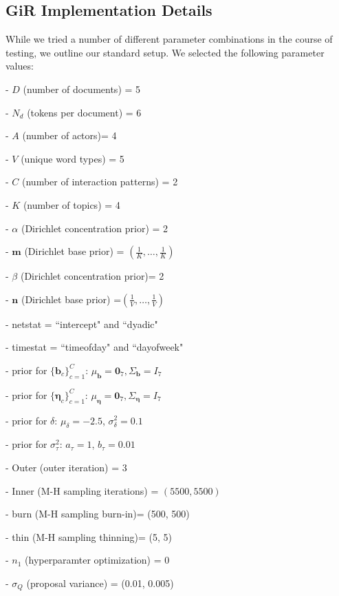 \documentclass[a4paper]{article}
\begin{document}
  \subsection{GiR Implementation Details} \label{subsec: GiR implementation}
  While we tried a number of different parameter combinations in the course of testing, we outline our standard setup. We selected the following parameter values:
  \begin{itemize}
  	\begin{minipage}{0.49\textwidth}
  		\item[-] $D$ (number of documents) = 5
  		\item[-] $N_d$ (tokens per document) = 6
  		\item[-] $A$ (number of actors)= 4
  		\item[-] $V$ (unique word types) = 5
  		\item[-] $C$ (number of interaction patterns) = 2
  		\item[-] $K$ (number of topics) = 4
  		\item[-] $\alpha$ (Dirichlet concentration prior) = 2
  		\item[-] $\boldsymbol{m}$ (Dirichlet base prior) = $(\frac{1}{K},\ldots, \frac{1}{K})$ 
  		\item[-] $\beta$ (Dirichlet concentration prior)= 2
  		\item[-] $\boldsymbol{n}$ (Dirichlet base prior) =$(\frac{1}{V},\ldots, \frac{1}{V})$ 
  		\item[-] netstat = ``intercept" and ``dyadic"
	   \item[-] timestat = ``timeofday" and ``dayofweek" 
  	\end{minipage}
  	\begin{minipage}{0.49\textwidth}
  		\item[-] prior for $\{\boldsymbol{b}_c\}_{c=1}^C$: $\mu_{\boldsymbol{b}} = \boldsymbol{0}_7, \Sigma_{\boldsymbol{b}} =  I_7$
  			\item[-] prior for $\{\boldsymbol{\eta}_c\}_{c=1}^C$: $\mu_{\boldsymbol{\eta}} = \boldsymbol{0}_7, \Sigma_{\boldsymbol{\eta}} =  I_7$
  		\item[-] prior for $\delta$: $\mu_\delta = -2.5$, $\sigma^2_\delta =0.1$
  		\item[-] prior for $\sigma^2_\tau$: $a_\tau = 1$, $b_\tau = 0.01$
  		\item[-] Outer (outer iteration) = 3
  		\item[-] Inner (M-H sampling iterations) = $(5500, 5500)$
  		\item[-] burn (M-H sampling burn-in)= (500, 500)
  		\item[-] thin (M-H sampling thinning)= (5, 5)
  		 \item[-] $n_1$ (hyperparamter optimization) = 0
  		\item[-] $\sigma_Q$ (proposal variance) = (0.01, 0.005)
  	\end{minipage}
  \end{itemize}        
\end{document}

